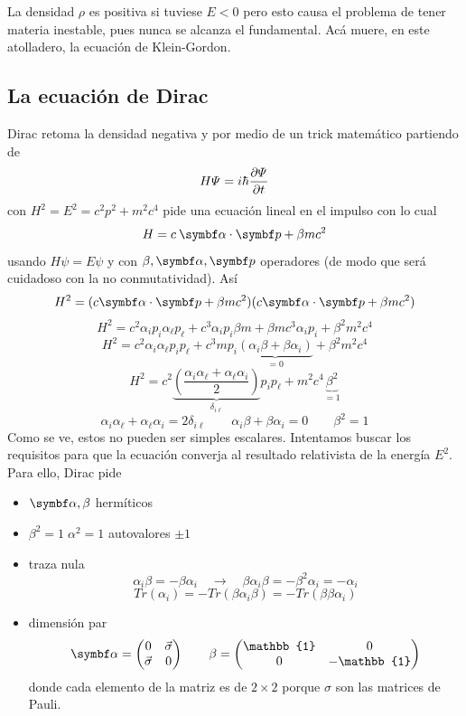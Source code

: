 \documentclass[10pt,oneside]{CBFT_book}
\begin{document}
La densidad $\rho$ es positiva si tuviese $E<0$ pero esto causa el problema de tener materia
inestable, pues nunca se alcanza el fundamental. 
Acá muere, en este atolladero, la ecuación de Klein-Gordon.

\subsection{La ecuación de Dirac}

Dirac retoma la densidad negativa y por medio de un trick matemático partiendo de 
\[
	H \Psi = i \hbar \frac{\partial^{\hspace{-0.05em}} {\Psi}}{\partial {t}^{\hspace{-0.05em}}}
\]
con $H^2 = E^2 = c^2p^2 + m^2c^4$ pide una ecuación lineal en el impulso  con lo cual
\[
	H = c \: \vb{\alpha} \cdot \vb{p} + \beta m c^2
\]
usando $H\psi = E\psi$ y con $\beta,\vb{\alpha},\vb{p}$ operadores (de modo que será cuidadoso
con la no conmutatividad). Así
\[
	H^2 = (c \vb{\alpha} \cdot \vb{p} + \beta m c^2)(c \vb{\alpha} \cdot \vb{p} + \beta m c^2)
\]
\[
	H^2 = c^2 \alpha_i p_i \alpha_\ell p_\ell + c^3 \alpha_i p_i \beta m +
	\beta m c^3 \alpha_i p_i + \beta^2 m^2 c^4
\]
\[
	H^2 = c^2 \alpha_i \alpha_\ell p_i  p_\ell + c^3 m p_i 
	\underbrace{( \alpha_i \beta + \beta \alpha_i )}_{=0} + \beta^2 m^2 c^4
\]
\[
	H^2 = 
	c^2 \underbrace{\left( \frac{\alpha_i \alpha_\ell +
	\alpha_\ell\alpha_i}{2} \right)}_{\delta_{i\ell}}
	p_i p_\ell + m^2 c^4 \underbrace{\beta^2 }_{ = 1 }
\]
\[
	\alpha_i \alpha_\ell + \alpha_\ell\alpha_i = 2 \delta_{i\ell} \qquad 
	\alpha_i \beta + \beta \alpha_i= 0 \qquad
	\beta^2 = 1
\]
Como se ve, estos no pueden ser simples escalares. 
Intentamos buscar los requisitos para que la ecuación converja al resultado relativista de
la energía $E^2$. 
Para ello, Dirac pide 
\begin{itemize}
 \item $\vb{\alpha},\beta$ hermíticos
 \item $\beta^2=1 \; \alpha^2=1$ autovalores $\pm 1$
 \item traza nula
 \[
	\alpha_i \beta = -\beta \alpha_i  \quad \rightarrow  \quad 
	\beta \alpha_i \beta = -\beta^2 \alpha_i = -\alpha_i
 \]
 \[
	Tr(\alpha_i) = -Tr(\beta \alpha_i \beta) = -Tr(\beta\beta\alpha_i)
 \]
 \item dimensión par 
 \[
	\vb{\alpha} = \begin{pmatrix} 0 & \vec{\sigma} \\ \vec{\sigma} & 0 \\ \end{pmatrix} \qquad 
	\beta = \begin{pmatrix} \mathbb{1} & 0 \\ 0 & -\mathbb{1} \\ \end{pmatrix}
 \]
 donde cada elemento de la matriz es de $2\times2$ porque $\sigma$ son las matrices de Pauli.
\end{itemize}
\end{document}
